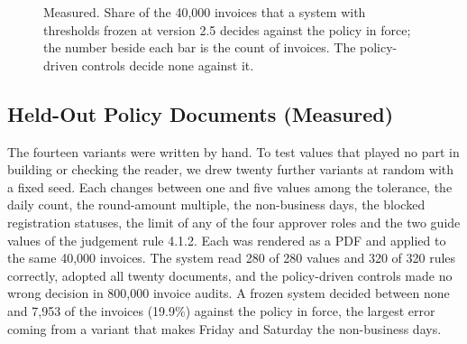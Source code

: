 \documentclass[conference]{IEEEtran}
\begin{document}
\begin{figure}[t]
\centering
{}
\caption{Measured. Share of the 40{,}000 invoices that a system with thresholds frozen at version 2.5 decides against the policy in force; the number beside each bar is the count of invoices. The policy-driven controls decide none against it.}
\label{fig:frozen}
\end{figure}

\subsection{Held-Out Policy Documents (Measured)}
\label{sec:heldout}
The fourteen variants were written by hand. To test values that played no part in building or checking the reader, we drew twenty further variants at random with a fixed seed. Each changes between one and five values among the tolerance, the daily count, the round-amount multiple, the non-business days, the blocked registration statuses, the limit of any of the four approver roles and the two guide values of the judgement rule 4.1.2. Each was rendered as a PDF and applied to the same 40{,}000 invoices. The system read 280 of 280 values and 320 of 320 rules correctly, adopted all twenty documents, and the policy-driven controls made no wrong decision in 800{,}000 invoice audits. A frozen system decided between none and 7{,}953 of the invoices (19.9\%) against the policy in force, the largest error coming from a variant that makes Friday and Saturday the non-business days.
\end{document}
